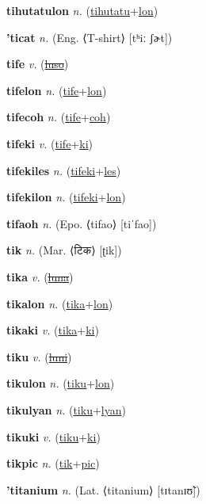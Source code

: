 \textbf{\hypertarget{tihutatulon}{tihutatulon}} \textit{n.} (\hyperlink{tihutatu}{tihutatu}+\allowbreak \hyperlink{lon}{lon})


\textbf{\hypertarget{'ticat}{'ticat}} \textit{n.} (Eng. ⟨T-shirt⟩ [tʰiː ʃɚt])


\textbf{\hypertarget{tife}{tife}} \textit{v.} (\hyperlink{luso}{\sout{luso}})


\textbf{\hypertarget{tifelon}{tifelon}} \textit{n.} (\hyperlink{tife}{tife}+\allowbreak \hyperlink{lon}{lon})


\textbf{\hypertarget{tifecoh}{tifecoh}} \textit{n.} (\hyperlink{tife}{tife}+\allowbreak \hyperlink{coh}{coh})


\textbf{\hypertarget{tifeki}{tifeki}} \textit{v.} (\hyperlink{tife}{tife}+\allowbreak \hyperlink{ki}{ki})


\textbf{\hypertarget{tifekiles}{tifekiles}} \textit{n.} (\hyperlink{tifeki}{tifeki}+\allowbreak \hyperlink{les}{les})


\textbf{\hypertarget{tifekilon}{tifekilon}} \textit{n.} (\hyperlink{tifeki}{tifeki}+\allowbreak \hyperlink{lon}{lon})


\textbf{\hypertarget{tifaoh}{tifaoh}} \textit{n.} (Epo. ⟨tifao⟩ [tiˈfao])


\textbf{\hypertarget{tik}{tik}} \textit{n.} (Mar. ⟨{\devanagari{}टिक}⟩ [ʈik])


\textbf{\hypertarget{tika}{tika}} \textit{v.} (\hyperlink{luna}{\sout{luna}})


\textbf{\hypertarget{tikalon}{tikalon}} \textit{n.} (\hyperlink{tika}{tika}+\allowbreak \hyperlink{lon}{lon})


\textbf{\hypertarget{tikaki}{tikaki}} \textit{v.} (\hyperlink{tika}{tika}+\allowbreak \hyperlink{ki}{ki})


\textbf{\hypertarget{tiku}{tiku}} \textit{v.} (\hyperlink{luni}{\sout{luni}})


\textbf{\hypertarget{tikulon}{tikulon}} \textit{n.} (\hyperlink{tiku}{tiku}+\allowbreak \hyperlink{lon}{lon})


\textbf{\hypertarget{tikulyan}{tikulyan}} \textit{n.} (\hyperlink{tiku}{tiku}+\allowbreak \hyperlink{lyan}{lyan})


\textbf{\hypertarget{tikuki}{tikuki}} \textit{v.} (\hyperlink{tiku}{tiku}+\allowbreak \hyperlink{ki}{ki})


\textbf{\hypertarget{tikpic}{tikpic}} \textit{n.} (\hyperlink{tik}{tik}+\allowbreak \hyperlink{pic}{pic})


\textbf{\hypertarget{'titanium}{'titanium}} \textit{n.} (Lat. ⟨titanium⟩ [tɪtanɪʊ̃])


